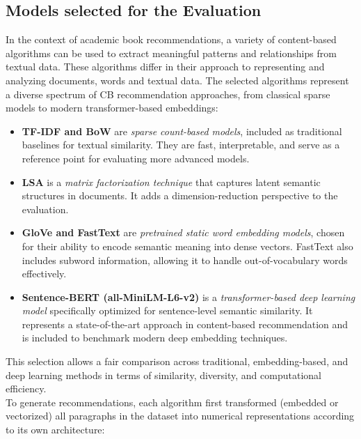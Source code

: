 \documentclass[conference]{IEEEtran}
\begin{document}
\subsection*{Models selected for the Evaluation}
In the context of academic book recommendations, a variety of content-based algorithms can be used to extract meaningful patterns and relationships from textual data. These algorithms differ in their approach to representing and analyzing documents, words and textual data. The selected algorithms represent a diverse spectrum of CB recommendation approaches, from classical sparse models to modern transformer-based embeddings:
%
\begin{itemize}
    \item \textbf{TF-IDF and BoW} are \emph{sparse count-based models}, included as traditional baselines for textual similarity. They are fast, interpretable, and serve as a reference point for evaluating more advanced models.
    \item \textbf{LSA} is a \emph{matrix factorization technique} that captures latent semantic structures in documents. It adds a dimension-reduction perspective to the evaluation.
    \item \textbf{GloVe and FastText} are \emph{pretrained static word embedding models}, chosen for their ability to encode semantic meaning into dense vectors. FastText also includes subword information, allowing it to handle out-of-vocabulary words effectively.
    \item \textbf{Sentence-BERT (all-MiniLM-L6-v2)} is a \emph{transformer-based deep learning model} specifically optimized for sentence-level semantic similarity. It represents a state-of-the-art approach in content-based recommendation and is included to benchmark modern deep embedding techniques.
\end{itemize}
%
This selection allows a fair comparison across traditional, embedding-based, and deep learning methods in terms of similarity, diversity, and computational efficiency.\\
%
To generate recommendations, each algorithm first transformed (embedded or vectorized) all paragraphs in the dataset into numerical representations according to its own architecture:
%
\end{document}
